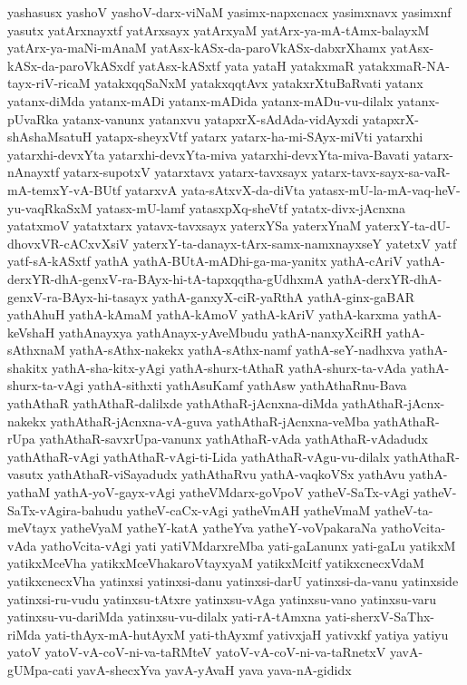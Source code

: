 {yashasusx
yashoV
yashoV-darx-viNaM
yasimx-napxcnacx
yasimxnavx
yasimxnf
yasutx
yatArxnayxtf
yatArxsayx
yatArxyaM
yatArx-ya-mA-tAmx-balayxM
yatArx-ya-maNi-mAnaM
yatAsx-kASx-da-paroVkASx-dabxrXhamx
yatAsx-kASx-da-paroVkASxdf
yatAsx-kASxtf
yata
yataH
yatakxmaR
yatakxmaR-NA-tayx-riV-ricaM
yatakxqqSaNxM
yatakxqqtAvx
yatakxrXtuBaRvati
yatanx
yatanx-diMda
yatanx-mADi
yatanx-mADida
yatanx-mADu-vu-dilalx
yatanx-pUvaRka
yatanx-vanunx
yatanxvu
yatapxrX-sAdAda-vidAyxdi
yatapxrX-shAshaMsatuH
yatapx-sheyxVtf
yatarx
yatarx-ha-mi-SAyx-miVti
yatarxhi
yatarxhi-devxYta
yatarxhi-devxYta-miva
yatarxhi-devxYta-miva-Bavati
yatarx-nAnayxtf
yatarx-supotxV
yatarxtavx
yatarx-tavxsayx
yatarx-tavx-sayx-sa-vaR-mA-temxY-vA-BUtf
yatarxvA
yata-sAtxvX-da-diVta
yatasx-mU-la-mA-vaq-heV-yu-vaqRkaSxM
yatasx-mU-lamf
yatasxpXq-sheVtf
yatatx-divx-jAcnxna
yatatxmoV
yatatxtarx
yatavx-tavxsayx
yaterxYSa
yaterxYnaM
yaterxY-ta-dU-dhovxVR-cACxvXsiV
yaterxY-ta-danayx-tArx-samx-namxnayxseY
yatetxV
yatf
yatf-sA-kASxtf
yathA
yathA-BUtA-mADhi-ga-ma-yanitx
yathA-cAriV
yathA-derxYR-dhA-genxV-ra-BAyx-hi-tA-tapxqqtha-gUdhxmA
yathA-derxYR-dhA-genxV-ra-BAyx-hi-tasayx
yathA-ganxyX-ciR-yaRthA
yathA-ginx-gaBAR
yathAhuH
yathA-kAmaM
yathA-kAmoV
yathA-kAriV
yathA-karxma
yathA-keVshaH
yathAnayxya
yathAnayx-yAveMbudu
yathA-nanxyXciRH
yathA-sAthxnaM
yathA-sAthx-nakekx
yathA-sAthx-namf
yathA-seY-nadhxva
yathA-shakitx
yathA-sha-kitx-yAgi
yathA-shurx-tAthaR
yathA-shurx-ta-vAda
yathA-shurx-ta-vAgi
yathA-sithxti
yathAsuKamf
yathAsw
yathAthaRnu-Bava
yathAthaR
yathAthaR-dalilxde
yathAthaR-jAcnxna-diMda
yathAthaR-jAcnx-nakekx
yathAthaR-jAcnxna-vA-guva
yathAthaR-jAcnxna-veMba
yathAthaR-rUpa
yathAthaR-savxrUpa-vanunx
yathAthaR-vAda
yathAthaR-vAdadudx
yathAthaR-vAgi
yathAthaR-vAgi-ti-Lida
yathAthaR-vAgu-vu-dilalx
yathAthaR-vasutx
yathAthaR-viSayadudx
yathAthaRvu
yathA-vaqkoVSx
yathAvu
yathA-yathaM
yathA-yoV-gayx-vAgi
yatheVMdarx-goVpoV
yatheV-SaTx-vAgi
yatheV-SaTx-vAgira-bahudu
yatheV-caCx-vAgi
yatheVmAH
yatheVmaM
yatheV-ta-meVtayx
yatheVyaM
yatheY-katA
yatheYva
yatheY-voVpakaraNa
yathoVcita-vAda
yathoVcita-vAgi
yati
yatiVMdarxreMba
yati-gaLanunx
yati-gaLu
yatikxM
yatikxMceVha
yatikxMceVhakaroVtayxyaM
yatikxMcitf
yatikxcnecxVdaM
yatikxcnecxVha
yatinxsi
yatinxsi-danu
yatinxsi-darU
yatinxsi-da-vanu
yatinxside
yatinxsi-ru-vudu
yatinxsu-tAtxre
yatinxsu-vAga
yatinxsu-vano
yatinxsu-varu
yatinxsu-vu-dariMda
yatinxsu-vu-dilalx
yati-rA-tAmxna
yati-sherxV-SaThx-riMda
yati-thAyx-mA-hutAyxM
yati-thAyxmf
yativxjaH
yativxkf
yatiya
yatiyu
yatoV
yatoV-vA-coV-ni-va-taRMteV
yatoV-vA-coV-ni-va-taRnetxV
yavA-gUMpa-cati
yavA-shecxYva
yavA-yAvaH
yava
yava-nA-gididx
}
